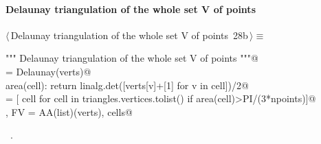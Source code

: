 \documentclass[11pt,oneside]{article}	%
\begin{document}
\paragraph{Delaunay triangulation of the whole set V of points}
\begin{flushleft} \small \label{scrap47}
\protect{}$\langle\,$Delaunay triangulation of the whole set V of points\nobreak\ {\footnotesize 28b}$\,\rangle\equiv$
\vspace{-1ex}
\begin{list}{}{} \item
\mbox{}\verb@""" Delaunay triangulation of the whole set V of points """@\\
\mbox{}\verb@triangles = Delaunay(verts)@\\
\mbox{}\verb@def area(cell): return linalg.det([verts[v]+[1] for v in cell])/2@\\
\mbox{}\verb@cells = [ cell for cell in triangles.vertices.tolist() if area(cell)>PI/(3*npoints)]@\\
\mbox{}\verb@V, FV = AA(list)(verts), cells@\\
\mbox{}\verb@@{\NWsep}
\end{list}
\vspace{-1ex}
\footnotesize\addtolength{\baselineskip}{-1ex}
\begin{list}{}{\setlength{\itemsep}{-\parsep}\setlength{\itemindent}{-\leftmargin}}
\item \NWtxtMacroRefIn\ .
\end{list}
\end{flushleft}
\end{document}
